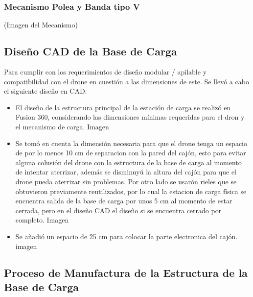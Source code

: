     \subsubsection{Mecanismo Polea y Banda tipo V}
    (Imagen del Mecanismo)

    \subsection{Diseño CAD de la Base de Carga}
    Para cumplir con los requerimientos de diseño modular / apilable y compatibilidad con el drone en cuestión a las dimensiones de este. Se llevó a cabo el siguiente diseño en CAD:

        \begin{itemize}
            \item     El diseño de la estructura principal de la estación de carga se realizó en Fusion 360, considerando las dimensiones mínimas requeridas para el dron y el mecanismo de carga.
            Imagen
            \item     Se tomó en cuenta la dimensión necesaria para que el drone tenga un espacio de por lo menos 10 cm de separacion con la pared del cajón, esto para evitar alguna colusión del drone con la estructura de la base de carga al momento de intentar aterrizar, además se disminuyú la altura del cajón para que el drone pueda aterrizar sin problemas. Por otro lado se usarón rieles que se obtuvieron previamente reutilizados, por lo cual la estacion de carga física se encuentra salida de la base de carga por unos 5 cm al momento de estar cerrada, pero en el diseño CAD el diseño si se encuentra cerrado por completo. 
            Imagen
            \item     Se añadió un espacio de 25 cm para colocar la parte electronica del cajón.
            imagen
        \end{itemize}



\subsection{Proceso de Manufactura de la Estructura de la Base de Carga}

